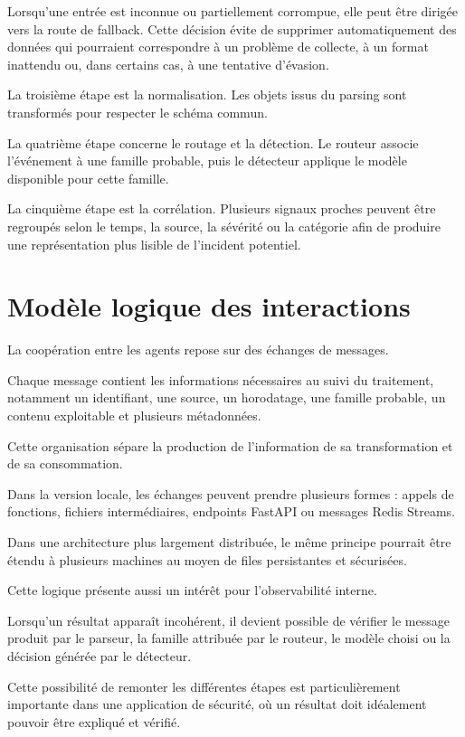 Lorsqu'une entrée est inconnue ou partiellement corrompue, elle peut être dirigée vers la route de fallback. Cette décision évite de supprimer automatiquement des données qui pourraient correspondre à un problème de collecte, à un format inattendu ou, dans certains cas, à une tentative d'évasion.

La troisième étape est la normalisation. Les objets issus du parsing sont transformés pour respecter le schéma commun.

La quatrième étape concerne le routage et la détection. Le routeur associe l'événement à une famille probable, puis le détecteur applique le modèle disponible pour cette famille.

La cinquième étape est la corrélation. Plusieurs signaux proches peuvent être regroupés selon le temps, la source, la sévérité ou la catégorie afin de produire une représentation plus lisible de l'incident potentiel.

\section{Modèle logique des interactions}

La coopération entre les agents repose sur des échanges de messages.

Chaque message contient les informations nécessaires au suivi du traitement, notamment un identifiant, une source, un horodatage, une famille probable, un contenu exploitable et plusieurs métadonnées.

Cette organisation sépare la production de l'information de sa transformation et de sa consommation.

Dans la version locale, les échanges peuvent prendre plusieurs formes : appels de fonctions, fichiers intermédiaires, endpoints FastAPI ou messages Redis Streams.

Dans une architecture plus largement distribuée, le même principe pourrait être étendu à plusieurs machines au moyen de files persistantes et sécurisées.

Cette logique présente aussi un intérêt pour l'observabilité interne.

Lorsqu'un résultat apparaît incohérent, il devient possible de vérifier le message produit par le parseur, la famille attribuée par le routeur, le modèle choisi ou la décision générée par le détecteur.

Cette possibilité de remonter les différentes étapes est particulièrement importante dans une application de sécurité, où un résultat doit idéalement pouvoir être expliqué et vérifié.

